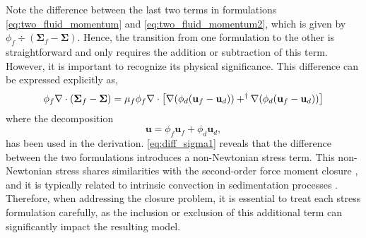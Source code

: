 Note the difference between the last two terms in formulations \ref{eq:two_fluid_momentum} and \ref{eq:two_fluid_momentum2}, which is given by $\phi_f \div (\bm\Sigma_f -\bm\Sigma)$.
Hence, the transition from one formulation to the other is straightforward and only requires the addition or subtraction of this term. 
However, it is important to recognize its physical significance.
This difference can be expressed explicitly as,
\begin{equation}
    \phi_f \div(\bm\Sigma_f - \bm\Sigma) = \mu_f \phi_f \div \left[\grad (\phi_d (\textbf{u}_f - \textbf{u}_d)) + ^\dagger\grad (\phi_d (\textbf{u}_f - \textbf{u}_d)) \right]
    \label{eq:diff_sigma1}
\end{equation}
where the decomposition 
\begin{equation}
\textbf{u} = \phi_f \textbf{u}_f + \phi_d \textbf{u}_d,
\label{eq:u_mean} 
\end{equation}
has been used in the derivation.
\ref{eq:diff_sigma1} reveals that the difference between the two formulations introduces a non-Newtonian stress term.
This non-Newtonian stress shares similarities with the second-order force moment closure \citep{jackson1997locally,zhang1997momentum}, and it is typically related to intrinsic convection in sedimentation processes \citep{lhuillier2022}.
Therefore, when addressing the closure problem, it is essential to treat each stress formulation carefully, as the inclusion or exclusion of this additional term can significantly impact the resulting model.





